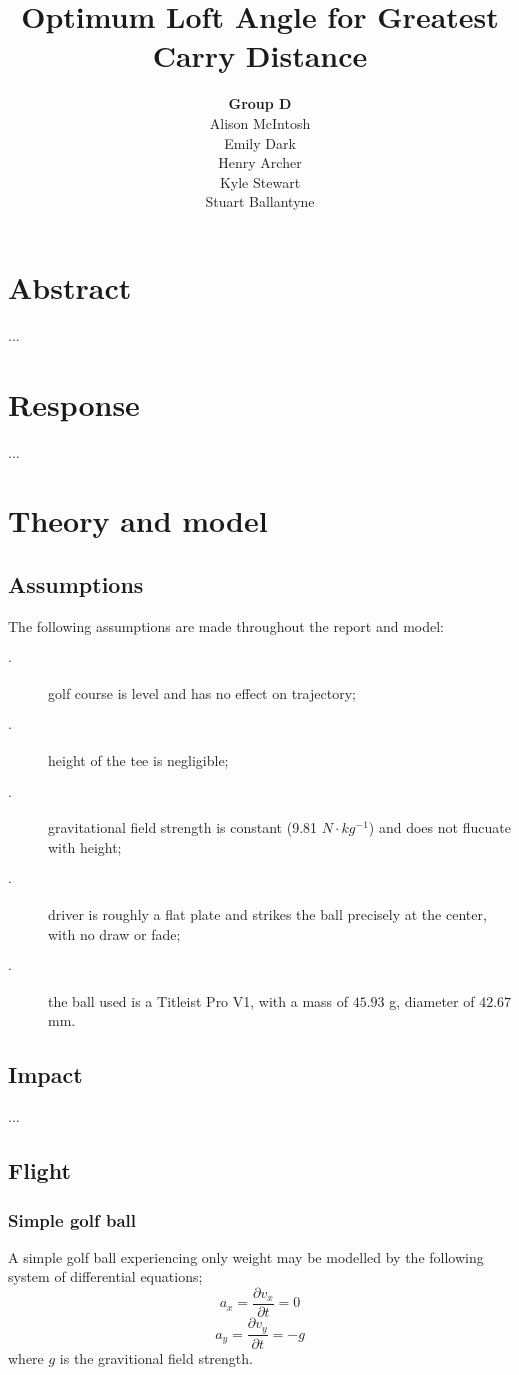 \documentclass[12pt]{article}
\title{\textbf{Optimum Loft Angle for Greatest Carry Distance}}
\author{\textbf{Group D}\\
		Alison McIntosh\\
		Emily Dark\\
		Henry Archer\\
		Kyle Stewart\\
		Stuart Ballantyne}
\date{}
\begin{document}
\begin{titlepage}
\maketitle
\thispagestyle{empty}
\pagebreak
\end{titlepage}


\section{Abstract}
...


\section{Response}
...

\section{Theory and model}

\subsection{Assumptions}
The following assumptions are made throughout the report and model:
\begin{description}
  \item[$\cdot$] golf course is level and has no effect on trajectory;
  \item[$\cdot$] height of the tee is negligible;
  \item[$\cdot$] gravitational field strength is constant (9.81 $N\cdot kg^{-1}$) and does not flucuate with height;
  \item[$\cdot$] driver is roughly a flat plate and strikes the ball precisely at the center, with no draw or fade;
  \item[$\cdot$] the ball used is a Titleist Pro V1, with a mass of $45.93$ g, diameter of $42.67$ mm.
  	
\end{description}

\subsection{Impact}
...
\pagebreak
\subsection{Flight}
\subsubsection{Simple golf ball}
A simple golf ball experiencing only weight may be modelled by the following system of differential equations;
\begin{equation}
a_x=\frac{\partial v_x}{\partial t}=0
\end{equation}
\begin{equation}
a_y=\frac{\partial v_y}{\partial t}=-g
\end{equation}
where $g$ is the gravitional field strength.
\end{document}
